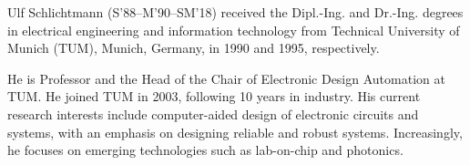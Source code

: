 \documentclass[journal,twoside]{IEEEtran}
\begin{document}
\begin{IEEEbiography}
{Ulf Schlichtmann} (S'88--M'90--SM'18) received the Dipl.-Ing. and Dr.-Ing.
degrees in electrical engineering and information technology from Technical
University  of  Munich (TUM), Munich, Germany, in 1990 and 1995,  respectively.

He is Professor and the Head of the Chair of Electronic Design Automation at
TUM. He joined TUM in 2003, following 10 years in industry. His current
research interests include computer-aided design of electronic circuits and
systems, with an emphasis on designing reliable and robust systems.
Increasingly, he focuses on emerging technologies such as lab-on-chip and
photonics.
\end{IEEEbiography}

\vfill
\end{document}
